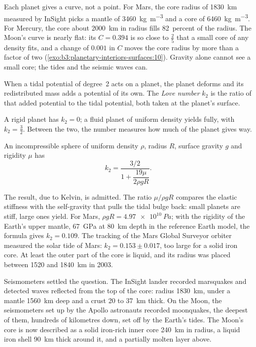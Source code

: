 Each planet gives a curve, not a point. For Mars, the core radius of
\qty{1830}{km} measured by InSight picks a mantle of \qty{3460}{kg.m^{-3}}
and a core of \qty{6460}{kg.m^{-3}}. For Mercury, the core about
\qty{2000}{km} in radius fills 82~percent of the radius. The Moon's curve
is nearly flat: its $C = 0.394$ is so close to $\tfrac25$ that a small core
of any density fits, and a change of $0.001$ in $C$ moves the core radius
by more than a factor of two (\cref{exo:b3:planetary-interiors-surfaces:10}).
Gravity alone cannot see a small core; the tides and the seismic waves can.

\begin{definition}\label{def:b3:planetary-interiors-surfaces:love-number}
When a tidal potential of degree~2 acts on a planet, the planet deforms and
its redistributed mass adds a potential of its own. The \emph{Love
number} $k_2$ is the ratio of that added potential to
the tidal potential, both taken at the planet's surface.
\end{definition}

A rigid planet has $k_2 = 0$; a fluid planet of uniform density yields
fully, with $k_2 = \tfrac32$. Between the two, the number measures how
much of the planet gives way.

\begin{proposition}\label{prop:b3:planetary-interiors-surfaces:kelvin}
An incompressible sphere of uniform density $\rho$, radius $R$, surface
gravity $g$ and rigidity $\mu$ has
\[
  k_2 = \frac{3/2}{1 + \dfrac{19\mu}{2\rho g R}} .
\]
\end{proposition}

The result, due to Kelvin, is admitted. The ratio $\mu/\rho gR$ compares
the elastic stiffness with the self-gravity that pulls the tidal bulge
back: small planets are stiff, large ones yield. For Mars, $\rho gR =
\qty{4.97e10}{Pa}$; with the rigidity of the Earth's upper mantle,
\qty{67}{GPa} at \qty{80}{km} depth in the reference Earth model, the
formula gives $k_2 = 0.109$. The tracking of the Mars Global Surveyor
orbiter measured the solar tide of Mars: $k_2 = 0.153 \pm 0.017$, too
large for a solid iron core. At least the outer part of the core is
liquid, and its radius was placed between 1520 and \qty{1840}{km} in 2003.

Seismometers settled the question. The InSight lander recorded
marsquakes and detected waves reflected from the top of the core: radius
\qty{1830}{km}, under a mantle \qty{1560}{km} deep and a crust 20 to
\qty{37}{km} thick. On the Moon, the seismometers set up by the Apollo
astronauts recorded moonquakes, the deepest of them, hundreds of
kilometres down, set off by the Earth's tides. The Moon's core is now
described as a solid iron-rich inner core \qty{240}{km} in radius, a
liquid iron shell \qty{90}{km} thick around it, and a partially molten
layer above.

